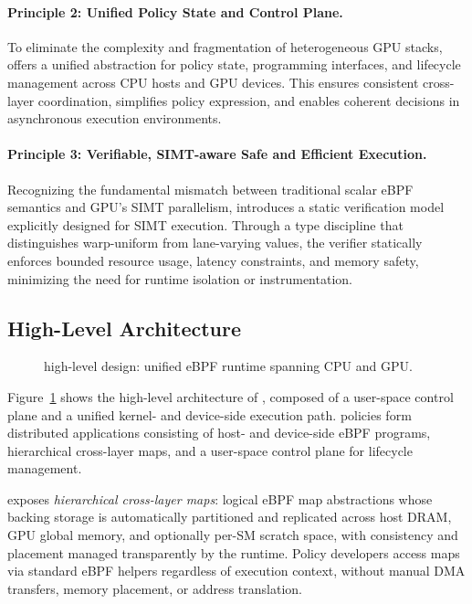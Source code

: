 \paragraph{Principle 2: Unified Policy State and Control Plane.}
To eliminate the complexity and fragmentation of heterogeneous GPU stacks, \sys offers a unified abstraction for policy state, programming interfaces, and lifecycle management across CPU hosts and GPU devices. This ensures consistent cross-layer coordination, simplifies policy expression, and enables coherent decisions in asynchronous execution environments.

\paragraph{Principle 3: Verifiable, SIMT-aware Safe and Efficient Execution.}
Recognizing the fundamental mismatch between traditional scalar eBPF semantics and GPU's SIMT parallelism, \sys introduces a static verification model explicitly designed for SIMT execution. Through a type discipline that distinguishes warp-uniform from lane-varying values, the verifier statically enforces bounded resource usage, latency constraints, and memory safety, minimizing the need for runtime isolation or instrumentation.

\subsection{High-Level Architecture}
\label{sec:arch}

\begin{figure}
\centering
{}
\vspace{-.5ex}
\caption{\sys high-level design: unified eBPF runtime spanning CPU and GPU.}
\label{fig:system-design}
\end{figure}

Figure~\ref{fig:system-design} shows the high-level architecture of \sys, composed of a user-space control plane and a unified kernel- and device-side execution path. \sys policies form distributed applications consisting of host- and device-side eBPF programs, hierarchical cross-layer maps, and a user-space control plane for lifecycle management.

\sys exposes \emph{hierarchical cross-layer maps}: logical eBPF map abstractions whose backing storage is automatically partitioned and replicated across host DRAM, GPU global memory, and optionally per-SM scratch space, with consistency and placement managed transparently by the runtime. Policy developers access maps via standard eBPF helpers regardless of execution context, without manual DMA transfers, memory placement, or address translation.

